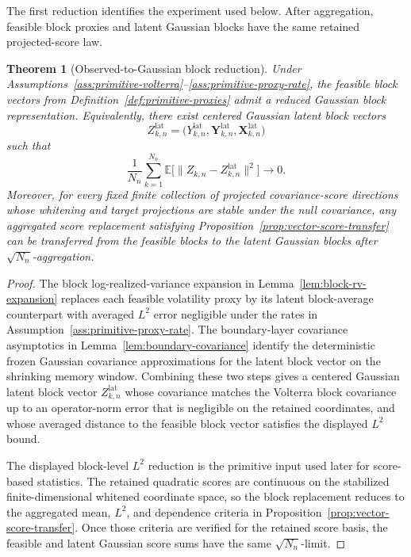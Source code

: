 \documentclass[11pt,a4paper]{amsart}
\theoremstyle{plain}
\newtheorem{theorem}{Theorem}[section]
\theoremstyle{definition}
\theoremstyle{remark}
\newcommand{\EE}{\mathbb{E}}
\begin{document}
The first reduction identifies the experiment used below.  After aggregation, feasible block
proxies and latent Gaussian blocks have the same retained projected-score law.

\begin{theorem}[Observed-to-Gaussian block reduction]\label{thm:observed-gaussian-reduction}
Under Assumptions~\ref{ass:primitive-volterra}--\ref{ass:primitive-proxy-rate}, the feasible block
vectors from Definition~\ref{def:primitive-proxies} admit a reduced Gaussian block representation.
Equivalently, there exist centered Gaussian latent block vectors
\[
        Z_{k,n}^{\mathrm{lat}}
        =
        \bigl(
        Y_{k,n}^{\mathrm{lat}},
        \mathbf Y_{k,n}^{\mathrm{lat}},
        \mathbf X_{k,n}^{\mathrm{lat}}
        \bigr)
\]
such that
\[
        \frac1{N_n}\sum_{k=1}^{N_n}
        \EE\bigl[
        \|Z_{k,n}-Z_{k,n}^{\mathrm{lat}}\|^2
        \bigr]
        \to0.
\]
Moreover, for every fixed finite collection of projected covariance-score directions whose
whitening and target projections are stable under the null covariance, any aggregated score
replacement satisfying Proposition~\ref{prop:vector-score-transfer} can be transferred from the
feasible blocks to the latent Gaussian blocks after \(\sqrt{N_n}\)-aggregation.
\end{theorem}

\begin{proof}
The block log-realized-variance expansion in Lemma~\ref{lem:block-rv-expansion} replaces each
feasible volatility proxy by its latent block-average counterpart with averaged \(L^2\) error
negligible under the rates in Assumption~\ref{ass:primitive-proxy-rate}.  The boundary-layer
covariance asymptotics in Lemma~\ref{lem:boundary-covariance} identify the deterministic frozen
Gaussian covariance approximations for the latent block vector on the shrinking memory window.
Combining these two steps gives a centered Gaussian latent block vector
\(Z_{k,n}^{\mathrm{lat}}\) whose covariance matches the Volterra block covariance up to an
operator-norm error that is negligible on the retained coordinates, and whose averaged distance to
the feasible block vector satisfies the displayed \(L^2\) bound.

The displayed block-level \(L^2\) reduction is the primitive input used later for score-based
statistics.  The retained quadratic scores are continuous on the stabilized finite-dimensional
whitened coordinate space, so the block replacement reduces to the aggregated mean, \(L^2\), and
dependence criteria in Proposition~\ref{prop:vector-score-transfer}.  Once those criteria are
verified for the retained score basis, the feasible and latent Gaussian score sums have the same
\(\sqrt{N_n}\)-limit.
\end{proof}
\end{document}
